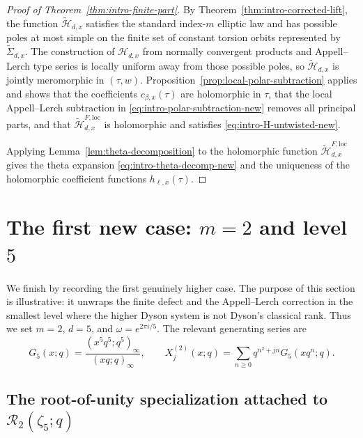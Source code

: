 \documentclass[12pt]{amsart}
\numberwithin{equation}{section}
\newcommand{\RRm}{\mathcal R}
\begin{document}
\begin{proof}[Proof of Theorem~\ref{thm:intro-finite-part}]
By Theorem~\ref{thm:intro-corrected-lift}, the function
\(\widetilde{\mathcal H}_{d,x}\) satisfies the standard index-\(m\) elliptic
law and has possible poles at most simple on the finite set of constant
torsion orbits represented by \(\widetilde\Sigma_{d,x}\).  The construction of
\(\mathcal H_{d,x}\) from normally convergent products and Appell--Lerch type
series is locally uniform away from those possible poles, so
\(\widetilde{\mathcal H}_{d,x}\) is jointly meromorphic in \((\tau,w)\).
Proposition~\ref{prop:local-polar-subtraction} applies and shows that the
coefficients \(c_{\beta,x}(\tau)\) are holomorphic in \(\tau\), that the local
Appell--Lerch subtraction in \eqref{eq:intro-polar-subtraction-new} removes all
principal parts, and that
\(\widetilde{\mathcal H}^{F,\mathrm{loc}}_{d,x}\) is holomorphic and satisfies
\eqref{eq:intro-H-untwisted-new}.

Applying Lemma~\ref{lem:theta-decomposition} to the holomorphic function
\(\widetilde{\mathcal H}^{F,\mathrm{loc}}_{d,x}\) gives the theta expansion
\eqref{eq:intro-theta-decomp-new} and the uniqueness of the holomorphic
coefficient functions \(h_{\ell,x}(\tau)\).
\end{proof}



\section{The first new case: \texorpdfstring{$m=2$}{m=2} and level \texorpdfstring{$5$}{5}}\label{sec:level5}

We finish by recording the first genuinely higher case.  The purpose of this section is illustrative: it unwraps the finite defect and the Appell--Lerch correction in the smallest level where the higher Dyson system is not Dyson's classical rank.  Thus we set
$m=2$, $d=5$, and $\omega=e^{2\pi i/5}$. The relevant generating series are
\[
G_5(x;q)=\frac{(x^5q^5;q^5)_\infty}{(xq;q)_\infty},
\qquad
X_j^{(2)}(x;q)=\sum_{n\geq 0}q^{n^2+jn}G_5(xq^n;q).
\]

\subsection{The root-of-unity specialization attached to \texorpdfstring{$\RRm_2(\zeta_5;q)$}{R2(zeta5;q)}}
\end{document}

